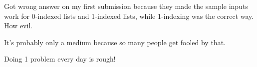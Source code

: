 Got wrong answer on my first submission because they made the sample inputs work for 0-indexed lists and 1-indexed lists, while 1-indexing was the correct way. How evil. 

It's probably only a medium because so many people get fooled by that.

Doing 1 problem every day is rough!
